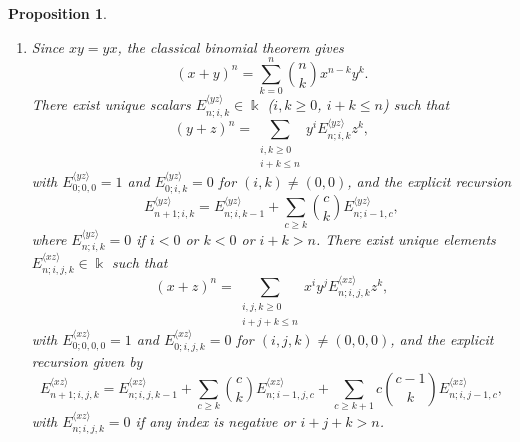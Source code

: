 \documentclass{amsart}
\newtheorem{proposition}[theorem]{Proposition}
\theoremstyle{definition}
\theoremstyle{remark}
\numberwithin{equation}{section}
\begin{document}
\begin{proposition}
\begin{enumerate}
\item [\rm (5)] Since $xy = yx$, the classical binomial theorem gives
\[
(x+y)^n=\sum_{k=0}^{n}\binom{n}{k}x^{n-k}y^{k}.
\]
There exist unique scalars $E^{\langle yz\rangle}_{n;i,k}\in\Bbbk$ {\rm (}$i,k\ge 0$, $i+k\le n${\rm )} such that
\begin{equation}\label{Eyzdefcase5iv}
\left(y + z\right)^n = \sum_{\substack{i,k\ge 0\\ i+k\le n}} y^{i} E^{\langle yz\rangle}_{n;i,k} z^{k},
\end{equation}
with $E^{\langle yz\rangle}_{0;0,0}=1$ and $E^{\langle yz\rangle}_{0;i,k}=0$ for $(i,k)\neq(0,0)$, and the explicit recursion
\begin{equation}\label{Eyzreccase5iv}
E^{\langle yz\rangle}_{n+1;i,k}=E^{\langle yz\rangle}_{n;i,k-1}+\sum_{c\ge k}\binom{c}{k} E^{\langle yz\rangle}_{n;i-1,c},
\end{equation}
where $E^{\langle yz\rangle}_{n;i,k}=0$ if $i<0$ or $k<0$ or $i+k>n$. There exist unique elements $E^{\langle xz\rangle}_{n;i,j,k}\in\Bbbk$ such that
\begin{equation}\label{Exzdefcase5iv}
\left(x + z\right)^n = \sum_{\substack{i,j,k\ge 0\\ i+j+k\le n}} x^{i}y^{j} E^{\langle xz\rangle}_{n;i,j,k} z^{k},
\end{equation}
with $E^{\langle xz\rangle}_{0;0,0,0}=1$ and $E^{\langle xz\rangle}_{0;i,j,k}=0$ for $(i,j,k)\neq(0,0,0)$, and the explicit recursion given by
\begin{equation}\label{Exzreccase5iv}
E^{\langle xz\rangle}_{n+1;i,j,k}=E^{\langle xz\rangle}_{n;i,j,k-1}
+\sum_{c\ge k}\binom{c}{k} E^{\langle xz\rangle}_{n;i-1,j,c}
+\sum_{c\ge k+1}c\binom{c-1}{k} E^{\langle xz\rangle}_{n;i,j-1,c},
\end{equation}
with $E^{\langle xz\rangle}_{n;i,j,k}=0$ if any index is negative or $i+j+k>n$.
\end{enumerate}
\end{proposition}
\end{document}
